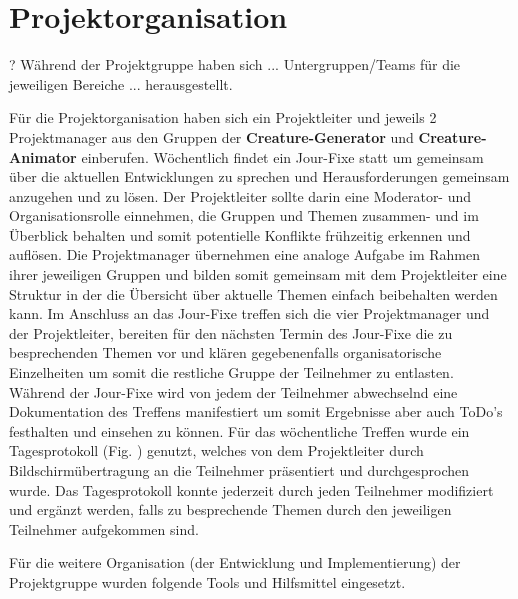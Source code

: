 \section{Projektorganisation}

? Während der Projektgruppe haben sich ... Untergruppen/Teams für die jeweiligen Bereiche ... herausgestellt.

Für die Projektorganisation haben sich ein Projektleiter und jeweils 2 Projektmanager aus den Gruppen der \textbf{Creature-Generator} und \textbf{Creature-Animator} einberufen. Wöchentlich findet ein Jour-Fixe statt um gemeinsam über die aktuellen Entwicklungen zu sprechen und Herausforderungen gemeinsam anzugehen und zu lösen. Der Projektleiter sollte darin eine Moderator- und Organisationsrolle einnehmen, die Gruppen und Themen zusammen- und im Überblick behalten und somit potentielle Konflikte frühzeitig erkennen und auflösen. Die Projektmanager übernehmen eine analoge Aufgabe im Rahmen ihrer jeweiligen Gruppen und bilden somit gemeinsam mit dem Projektleiter eine Struktur in der die Übersicht über aktuelle Themen einfach beibehalten werden kann. Im Anschluss an das Jour-Fixe treffen sich die vier Projektmanager und der Projektleiter, bereiten für den nächsten Termin des Jour-Fixe die zu besprechenden Themen vor und klären gegebenenfalls organisatorische Einzelheiten um somit die restliche Gruppe der Teilnehmer zu entlasten. Während der Jour-Fixe wird von jedem der Teilnehmer abwechselnd eine Dokumentation des Treffens manifestiert um somit Ergebnisse aber auch ToDo's festhalten und einsehen zu können. Für das wöchentliche Treffen wurde ein Tagesprotokoll (Fig. ) genutzt, welches von dem Projektleiter durch Bildschirmübertragung an die Teilnehmer präsentiert und durchgesprochen wurde. Das Tagesprotokoll konnte jederzeit durch jeden Teilnehmer modifiziert und ergänzt werden, falls zu besprechende Themen durch den jeweiligen Teilnehmer aufgekommen sind.

Für die weitere Organisation (der Entwicklung und Implementierung) der Projektgruppe wurden folgende Tools und Hilfsmittel eingesetzt. 

